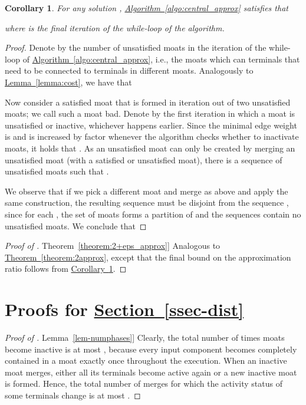 \documentclass[letterpaper,11pt]{article}
\newtheorem{corollary}[theorem]{Corollary}
\newcommand{\namedref}[2]{\hyperref[#2]{#1~\ref*{#2}}}
\newcommand{\sectionref}[1]{\namedref{Section}{#1}}
\newcommand{\theoremref}[1]{\namedref{Theorem}{#1}}
\newcommand{\lemmaref}[1]{\namedref{Lemma}{#1}}
\newcommand{\corollaryref}[1]{\namedref{Corollary}{#1}}
\newcommand{\algref}[1]{\namedref{Algorithm}{#1}}
\begin{document}
\begin{corollary}\label{coro:cost_approx}
For any solution , \algref{algo:central_approx} satisfies that

where  is the final iteration of the while-loop of the algorithm.
\end{corollary}
\begin{proof}
Denote by  the number of unsatisfied moats in the  iteration of the
while-loop of \algref{algo:central_approx}, i.e., the moats which can terminals
that need to be connected to terminals in different moats. Analogously to
\lemmaref{lemma:cost}, we have that

Now consider a satisfied moat  that is formed in iteration 
out of two unsatisfied moats; we call such a moat bad. Denote by 
the first iteration in which a moat  is unsatisfied or
inactive, whichever happens earlier. Since the minimal edge weight is  and
 is increased by factor  whenever the algorithm
checks whether to inactivate moats, it holds that . As an unsatisfied moat
can only be created by merging an unsatisfied moat (with a satisfied or
unsatisfied moat), there is a sequence of unsatisfied moats  such that .

We observe that if we pick a different moat  and merge  as above and
apply the same construction, the resulting sequence
 must be disjoint from the sequence
, since for each , the set of moats  forms a partition of  and
the sequences contain no unsatisfied moats. We conclude that

\end{proof}

\begin{proof}[Proof of \theoremref{theorem:2+eps_approx}]
Analogous to \theoremref{theorem:2approx}, except that the final bound on the
approximation ratio follows from \corollaryref{coro:cost_approx}.
\end{proof}

\section{\texorpdfstring{Proofs for \sectionref{ssec-dist}}{Proofs Concerning
the Distributed Moat Growing Algorithm}}
\label{app-dist}


\begin{proof}[Proof of \lemmaref{lem-numphases}]
  Clearly, the total number of times moats become inactive is at
  most , because every input component becomes completely contained in a moat
  exactly once throughout the execution. When  an inactive moat
  merges, either all its 
  terminals become active again or a new inactive moat is formed. Hence, the
  total number of merges for which the activity status of some terminals change
  is at most .
\end{proof}
\end{document}
